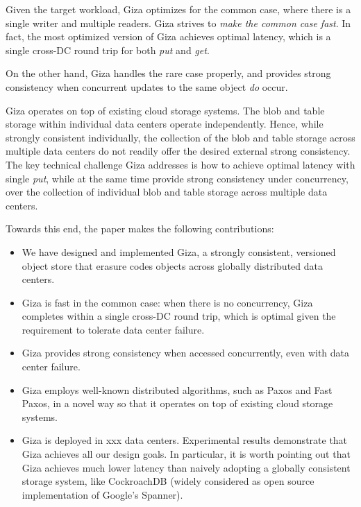 Given the target workload, Giza optimizes for the common case, where there is
a single writer and multiple readers. Giza strives to {\em make the common case
fast}. In fact, the most optimized version of Giza achieves optimal latency,
which is a single cross-DC round trip for both {\em put} and {\em get}.

On the other hand, Giza handles the rare case properly,
and provides strong consistency when concurrent updates to the same object {\em do} occur.

Giza operates on top of existing cloud storage systems. 
The blob and table storage within individual data centers operate independently.
Hence, while strongly consistent individually, the collection of the blob and
table storage across multiple data centers do not readily offer the desired
external strong consistency. The key technical challenge Giza addresses is how to achieve
optimal latency with single {\em put}, while at the same time provide
strong consistency under concurrency, over the collection of individual blob and
table storage across multiple data centers.

Towards this end, the paper makes the following contributions:
\begin{itemize}
    \item We have designed and implemented Giza, a strongly consistent,
      versioned object store that erasure codes objects across globally
      distributed data centers.
    \item Giza is fast in the common case: when there is no concurrency, Giza
      completes within a single cross-DC round trip, which is optimal given the
      requirement to tolerate data center failure.
    \item Giza provides strong consistency when accessed concurrently, even with data center
      failure.
    \item Giza employs well-known distributed algorithms, such as Paxos and Fast
      Paxos, in a novel way so that it operates on top of existing cloud storage
      systems.
    \item Giza is deployed in xxx data centers. Experimental results demonstrate
      that Giza achieves all our design goals. In particular, it is worth
      pointing out that Giza achieves much lower latency than naively adopting a
      globally consistent storage system, like CockroachDB (widely considered as open source
      implementation of Google's Spanner).
\end{itemize}
